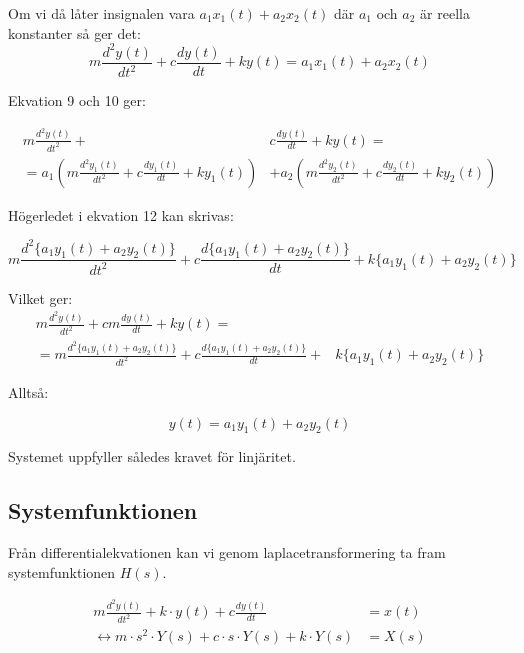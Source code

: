 \documentclass[10pt,a4paper]{article}
\begin{document}
Om vi då låter insignalen vara $a_1 x_1(t) + a_2 x_2(t)$ där $a_1$ och $a_2$ är reella konstanter så ger det:
\begin{equation}
m\frac{d^2y(t)}{dt^2} + c\frac{dy(t)}{dt} + ky(t) = a_1 x_1(t) + a_2 x_2(t)
\end{equation}

Ekvation 9 och 10 ger:

\begin{equation}
\begin{split}
m\frac{d^2y(t)}{dt^2} + & c\frac{dy(t)}{dt} + ky(t) = \\ = a_1(m\frac{d^2y_1(t)}{dt^2} + c\frac{dy_1(t)}{dt} +  ky_1(t)) & + a_2(m\frac{d^2y_2(t)}{dt^2} + c\frac{dy_2(t)}{dt} + ky_2(t))
\end{split}
\end{equation}

Högerledet i ekvation 12 kan skrivas:

\begin{equation}
m\frac{d^2\{a_1y_1(t) + a_2y_2(t)\}}{dt^2} + c\frac{d\{a_1y_1(t) + a_2y_2(t)\}}{dt} + k\{a_1y_1(t) + a_2y_2(t)\}
\end{equation}

Vilket ger:
\begin{equation}
\begin{split}
m\frac{d^2y(t)}{dt^2} +  cm\frac{dy(t)}{dt} + ky(t) = & \\ = m\frac{d^2\{a_1y_1(t) + a_2y_2(t)\}}{dt^2} + c\frac{d\{a_1y_1(t) + a_2y_2(t)\}}{dt} + & k\{a_1y_1(t) + a_2y_2(t)\}
\end{split}
\end{equation}

Alltså:

\begin{equation}
y(t) = a_1 y_1(t) + a_2 y_2(t)
\end{equation}

Systemet uppfyller således kravet för linjäritet.

\newpage



\subsection{Systemfunktionen}

Från differentialekvationen kan vi genom laplacetransformering ta fram systemfunktionen $H(s)$.

\begin{equation}
\begin{split}
 m\frac{d^2y(t)}{dt^2} + k \cdot y(t) + c\frac{dy(t)}{dt} & = x(t) \\ \leftrightarrow m \cdot s^2 \cdot Y(s) + c \cdot s \cdot Y(s) + k \cdot Y(s) & = X(s)
\end{split}
\end{equation}
\end{document}
